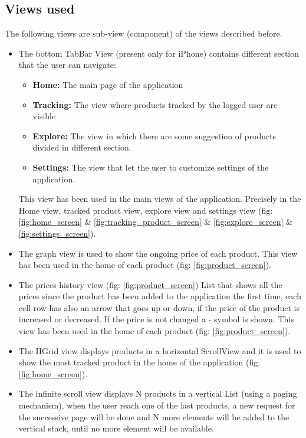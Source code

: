 \subsection{Views used}
The following views are sub-view (component) of the views described before.
\begin{itemize}
    \item {
        The bottom TabBar View (present only for iPhone) contains different section that the user can navigate:
        \begin{itemize}
            \item \textbf{Home:} The main page of the application
            \item \textbf{Tracking:} The view where products tracked by the logged user are visible
            \item \textbf{Explore:} The view in which there are some suggestion of products divided in different section.
            \item \textbf{Settings:} The view that let the user to customize settings of the application.
        \end{itemize}
        This view has been used in the main views of the application. Precisely in the Home view, tracked product view, explore view and settings view (fig: \ref{fig:home_screen} \& \ref{fig:tracking_product_screen} \& \ref{fig:explore_screen} \& \ref{fig:settings_screen}).
    }
    \item {
        The graph view is used to show the ongoing price of each product.
        This view has been used in the home of each product (fig: \ref{fig:product_screen}).
    }
    \item {
        The prices history view (fig: \ref{fig:product_screen}) List that shows all the prices since the product has been added to the application the first time, each cell row has also an arrow that goes up or down, if the price of the product is increased or decreased. If the price is not changed a - symbol is shown.
        This view has been used in the home of each product (fig: \ref{fig:product_screen}).
    }
    \item {
        The HGrid view displays products in a horizontal ScrollView and it is used to show the most tracked product in the home of the application (fig: \ref{fig:home_screen}).
    }
    \item {
        The infinite scroll view displays N products in a vertical List (using a paging mechanism), when the user reach one of the last products, a new request for the successive page will be done and N more elements will be added to the vertical stack, until no more element will be available.
}
\end{itemize}
